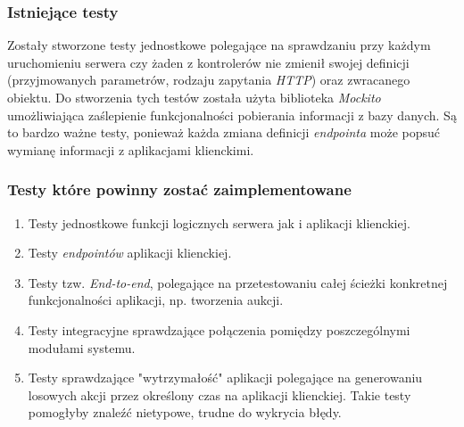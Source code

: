 \documentclass[10pt,titlepage]{article} %
\begin{document}
\subsubsection{Istniejące testy}
Zostały stworzone testy jednostkowe polegające na sprawdzaniu przy każdym uruchomieniu serwera czy żaden z kontrolerów nie zmienił swojej definicji (przyjmowanych parametrów, rodzaju zapytania \textit{HTTP}) oraz zwracanego obiektu. Do stworzenia tych testów została użyta biblioteka \textit{Mockito} umożliwiająca zaślepienie funkcjonalności pobierania informacji z bazy danych. Są to bardzo ważne testy, ponieważ każda zmiana definicji \textit{endpointa} może popsuć wymianę informacji z aplikacjami klienckimi.
\subsubsection{Testy które powinny zostać zaimplementowane}
\begin{enumerate}[1.]
\item Testy jednostkowe funkcji logicznych serwera jak i aplikacji klienckiej.
\item Testy \textit{endpointów} aplikacji klienckiej.
\item Testy tzw. \textit{End-to-end}, polegające na przetestowaniu całej ścieżki konkretnej funkcjonalności aplikacji, np. tworzenia aukcji. 
\item Testy integracyjne sprawdzające połączenia pomiędzy poszczególnymi modułami systemu.
\item Testy sprawdzające "wytrzymałość" aplikacji polegające na generowaniu losowych akcji przez określony czas na aplikacji klienckiej. Takie testy pomogłyby znaleźć nietypowe, trudne do wykrycia błędy.
\end{enumerate}
\end{document}
